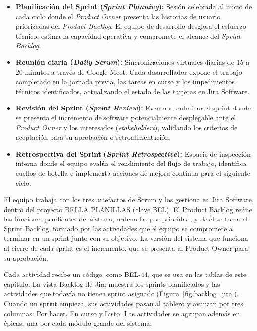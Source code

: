 \begin{itemize}
    \item \textbf{Planificación del Sprint (\textit{Sprint Planning}):} Sesión celebrada al inicio de cada ciclo donde el 
    \textit{Product Owner} presenta las historias de usuario priorizadas del \textit{Product Backlog}. 
    El equipo de desarrollo desglosa el esfuerzo técnico, estima la capacidad operativa y compromete el alcance del \textit{Sprint Backlog}.
    \item \textbf{Reunión diaria (\textit{Daily Scrum}):} Sincronizaciones virtuales diarias de 15 a 20 minutos a través de Google Meet. 
    Cada desarrollador expone el trabajo completado en la jornada previa, las tareas en curso y los impedimentos técnicos identificados, 
    actualizando el estado de las tarjetas en Jira Software.
    \item \textbf{Revisión del Sprint (\textit{Sprint Review}):} Evento al culminar el sprint donde se presenta el incremento de software potencialmente desplegable 
    ante el \textit{Product Owner} y los interesados (\textit{stakeholders}), 
    validando los criterios de aceptación para su aprobación o retroalimentación.
    \item \textbf{Retrospectiva del Sprint (\textit{Sprint Retrospective}):} Espacio de inspección interna donde el equipo evalúa el rendimiento del flujo de trabajo, 
    identifica cuellos de botella e implementa acciones de mejora continua para el siguiente ciclo.
\end{itemize}


El equipo trabaja con los tres artefactos de Scrum y los gestiona en Jira Software, 
dentro del proyecto BELLA PLANILLAS (clave BEL). 
El Product Backlog reúne las funciones pendientes del sistema, ordenadas por prioridad, 
y de él se toma el Sprint Backlog, formado por las actividades que el equipo se compromete a terminar en un sprint junto con su objetivo. 
La versión del sistema que funciona al cierre de cada sprint es el incremento, que se presenta al Product Owner para su aprobación.

Cada actividad recibe un código, como BEL-44, que se usa en las tablas de este capítulo. 
La vista Backlog de Jira muestra los sprints planificados y las actividades que todavía no tienen sprint asignado (Figura~\ref{fig:backlog_jira}). 
Cuando un sprint empieza, sus actividades pasan al tablero y avanzan por tres columnas: Por hacer, En curso y Listo. 
Las actividades se agrupan además en épicas, una por cada módulo grande del sistema.

